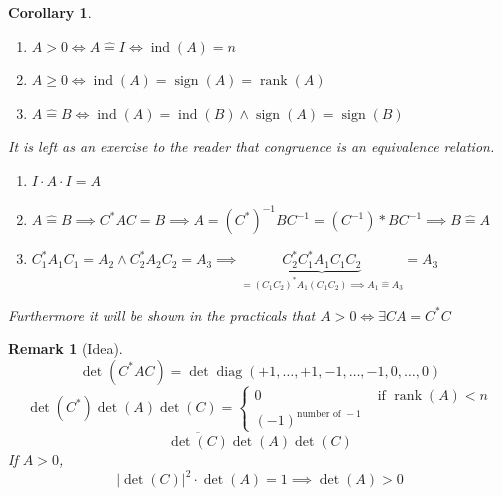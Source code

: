\documentclass[a4paper]{article}
\newcounter{lecref}[section]
\numberwithin{lecref}{section}
\newtheorem*{Remark}{Remark}
\newtheorem{corollary}[lecref]{Corollary}
\newcommand{\card}[1]{\left|#1\right|}
\DeclareMathOperator{\rank}{rank}
\DeclareMathOperator{\sign}{sign}
\begin{document}
\begin{corollary} %
  \label{cor829}
  \begin{enumerate}
    \item $A > 0 \iff A \hat= I \iff \operatorname{ind}(A) = n$
    \item $A \geq 0 \iff \operatorname{ind}(A) = \sign(A) = \rank(A)$
    \item $A \hat= B \iff \operatorname{ind}(A) = \operatorname{ind}(B) \land \sign(A) = \sign(B)$
  \end{enumerate}
  It is left as an exercise to the reader that congruence is an equivalence relation.
  \begin{enumerate}
    \item $I \cdot A \cdot I = A$
    \item $A \hat= B \implies C^* A C = B \implies A = (C^*)^{-1} BC^{-1} = (C^{-1})* BC^{-1} \implies B \hat= A$
    \item $C^*_1 A_1 C_1 = A_2 \land C_2^* A_2 C_2 = A_3 \implies \underbrace{C_2^* C_1^* A_1 C_1 C_2}_{= (C_1 C_2)^* A_1 (C_1 C_2) \implies A_1 \hat= A_3} = A_3$
  \end{enumerate}
  Furthermore it will be shown in the practicals that $A > 0 \iff \exists C A = C^* C$
\end{corollary}

\begin{Remark}[Idea]
  \[
    \det(C^* A C) = \det%
    \operatorname{diag}(+1, \dots, +1, -1, \dots, -1, 0, \dots, 0)
  \] \[
    \det(C^*) \det(A) \det(C) = \begin{cases}
      0 & \text{ if } \rank(A) < n \\
      (-1)^{\text{number of } -1}
    \end{cases}
  \]
  \[ \overline{\det(C)} \det(A) \det(C) \]
  If $A > 0$,
  \[ \card{\det(C)}^2 \cdot \det(A) = 1 \implies \det(A) > 0 \]
\end{Remark}
\end{document}
